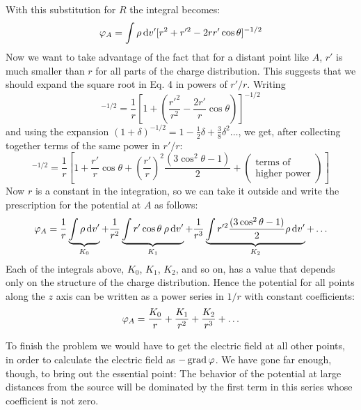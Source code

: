 With this substitution for $R$ the integral becomes:
\begin{equation}
  \varphi_A = \int \rho\operatorname{d\!} v'[r^2 + r'^2 - 2rr'\cos\theta]^{-1/2}
\end{equation}
Now we want to take advantage of the fact that for a distant point
like $A$, $r'$ is much smaller than $r$ for all parts of the charge distribution.
This suggests that we should expand the square root in Eq. 4 in
powers of $r'/r$. Writing
\begin{equation}
  [r^2 + r'^2 - 2rr'\cos\theta]^{-1/2} 
      = \frac{1}{r}\left[1+\left(\frac{r'^2}{r^2}-\frac{2r'}{r}\cos\theta\right)\right]^{-1/2}
\end{equation}
and using the expansion $(1+\delta)^{-1/2}=1-\frac{1}{2}\delta+\frac{3}{8}\delta^2\ldots$, we get,
after collecting together terms of the same power in $r'/r$:
\begin{equation}
  [r^2 + r'^2 - 2rr'\cos\theta]^{-1/2}
   = \frac{1}{r}\left[1+\frac{r'}{r}\cos\theta
                       +\left(\frac{r'}{r}\right)^2\frac{(3\cos^2\theta-1)}{2}
                       +\left(\begin{array}{cc}\text{terms of}\\\text{higher power}\end{array}\right)\right]
\end{equation}
Now $r$ is a constant in the integration, so we can take it outside and
write the prescription for the potential at $A$ as follows:
\begin{equation}
  \varphi_A =
        \frac{1}{r}  \underbrace{\int\rho\operatorname{d\!} v'}_{K_0}
       +\frac{1}{r^2}\underbrace{\int r'\cos\theta\:\rho\operatorname{d\!} v'}_{K_1}
       +\frac{1}{r^3}\underbrace{\int r'^2\frac{(3\cos^2\theta-1)}{2}\rho\operatorname{d\!} v'}_{K_2}
       +\ldots
\end{equation}
Each of the integrals above, $K_0$, $K_1$, $K_2$, and so on, has a value that
depends only on the structure of the charge distribution. Hence the
potential for all points along the $z$ axis can be written as a power series
in $1/r$ with constant coefficients:
\begin{equation}
  \varphi_A = \frac{K_0}{r}+\frac{K_1}{r^2}+\frac{K_2}{r^3}+\ldots
\end{equation}

To finish the problem we would have to get the electric field at all
other points, in order to calculate the electric field as  $-\operatorname{grad}\varphi$. We
have gone far enough, though, to bring out the essential point: The
behavior of the potential at large distances from the source will be
dominated by the first term in this series whose coefficient is not zero.

